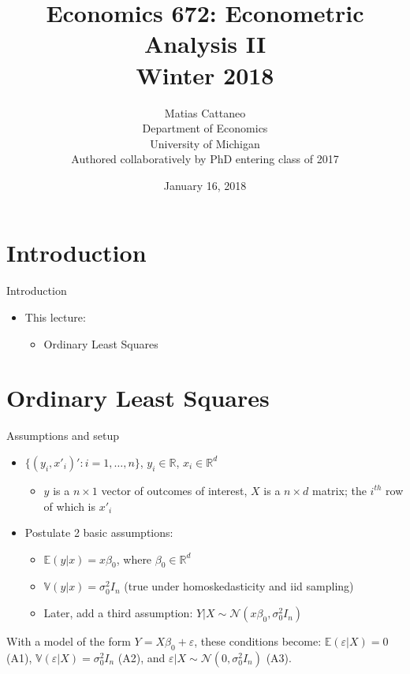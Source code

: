 \documentclass[fleqn, 10pt]{beamer}
\title[Econ-672]{Economics 672: Econometric Analysis II \\ Winter 2018}
\author[M. Cattaneo]{Matias Cattaneo \\
        Department of Economics \\
        University of Michigan \\
        Authored collaboratively by PhD entering class of 2017
        }
\date{January 16, 2018}
\begin{document}


\begin{frame}[plain]
    \titlepage
\end{frame}


\section{Introduction}

\begin{frame}{Introduction}
	\begin{itemize}
		\item This lecture:
		\begin{itemize}
			\item Ordinary Least Squares
		\end{itemize}
	\end{itemize}
\end{frame}

\section{Ordinary Least Squares}

\begin{frame}{Assumptions and setup}

    \begin{itemize}
		\item $\{(y_i,x'_i)':i=1,\dots,n\}$, $y_i \in \mathbb{R}$, $x_i \in \mathbb{R}^d$
		\begin{itemize}
			\item $y$ is a $n\times 1$ vector of outcomes of interest, $X$ is a $n\times d$ matrix; the $i^{th}$ row of which is $x'_i$
		\end{itemize}
		\item Postulate 2 basic assumptions:
		\begin{itemize}
			\item $\mathbb{E}(y|x)=x\beta_0$, where $\beta_0 \in \mathbb{R}^d$
			\item $\mathbb{V}(y|x)=\sigma^2_0 I_n $ (true under homoskedasticity and iid sampling)
			\item Later, add a third assumption: $Y|X\sim \mathcal{N}(x\beta_0,\sigma^2_0I_n) $
		\end{itemize}
	\end{itemize}
	
	With a model of the form $Y=X\beta_0+\varepsilon$, these conditions become: $\mathbb{E}(\varepsilon|X)=0 $ (A1), $\mathbb{V}(\varepsilon|X)=\sigma^2_0 I_n $ (A2), and $\varepsilon|X \sim \mathcal{N}(0,\sigma^2_0I_n) $ (A3).
	
\end{frame}
\end{document}
